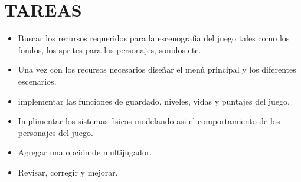\documentclass{article}
\begin{document}
\section{TAREAS}
\begin{itemize}
\item Buscar los recursos requeridos para la escenografia del juego tales como los fondos, los sprites para los personajes, sonidos etc.\\
\item Una vez con los recursos necesarios diseñar el menú principal y los diferentes escenarios.\\
\item implementar las funciones de guardado, niveles, vidas y puntajes del juego.\\
\item Implimentar los sistemas fisicos modelando asi el comportamiento de los personajes del juego.\\
\item Agregar una opción de multijugador.\\
\item Revisar, corregir y mejorar.\\
\end{itemize}
\end{document}
